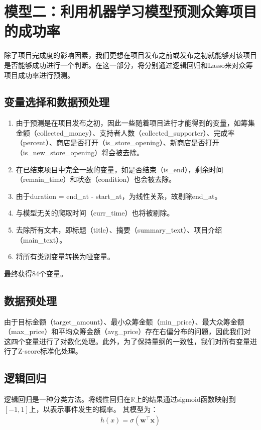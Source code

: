\documentclass[lang=cn,a4paper]{elegantpaper}
\begin{document}
\section{模型二：利用机器学习模型预测众筹项目的成功率}
除了项目完成度的影响因素，我们更想在项目发布之前或发布之初就能够对该项目是否能够成功进行一个判断。在这一部分，将分别通过逻辑回归和Lasso来对众筹项目成功率进行预测。

\subsection{变量选择和数据预处理}
\label{sec:变量选择}
\begin{enumerate}
\item 由于预测是在项目发布之初，因此一些随着项目进行才能得到的变量，如筹集金额（collected\_money）、支持者人数（collected\_supporter）、完成率（percent）、商店是否打开（is\_store\_opening）、新商店是否打开（is\_new\_store\_opening）将会被去除。
\item 在已结束项目中完全一致的变量，如是否结束（is\_end），剩余时间（remain\_time）和状态（condition）也会被去除。
\item 由于duration = end\_at - start\_at，为线性关系，故剔除end\_at。
\item 与模型无关的爬取时间（curr\_time）也将被剔除。
\item 去除所有文本，即标题（title）、摘要（summary\_text）、项目介绍（main\_text）。
\item 将所有类别变量转换为哑变量。
\end{enumerate}
最终获得84个变量。
\subsection{数据预处理}
\label{sec:数据预处理}
由于目标金额（target\_amount）、最小众筹金额（min\_price）、最大众筹金额（max\_price）和平均众筹金额（avg\_price）存在右偏分布的问题，因此我们对这四个变量进行了对数化处理。此外，为了保持量纲的一致性，我们对所有变量进行了Z-score标准化处理。


\subsection{逻辑回归}
逻辑回归是一种分类方法。将线性回归在$\mathbb{R}$上的结果通过sigmoid函数映射到$[-1,1]$上，以表示事件发生的概率。
其模型为：
\begin{align*}
h(x) = \sigma(\mathbf{w}^\top\mathbf{x})
\end{align*}
\end{document}
